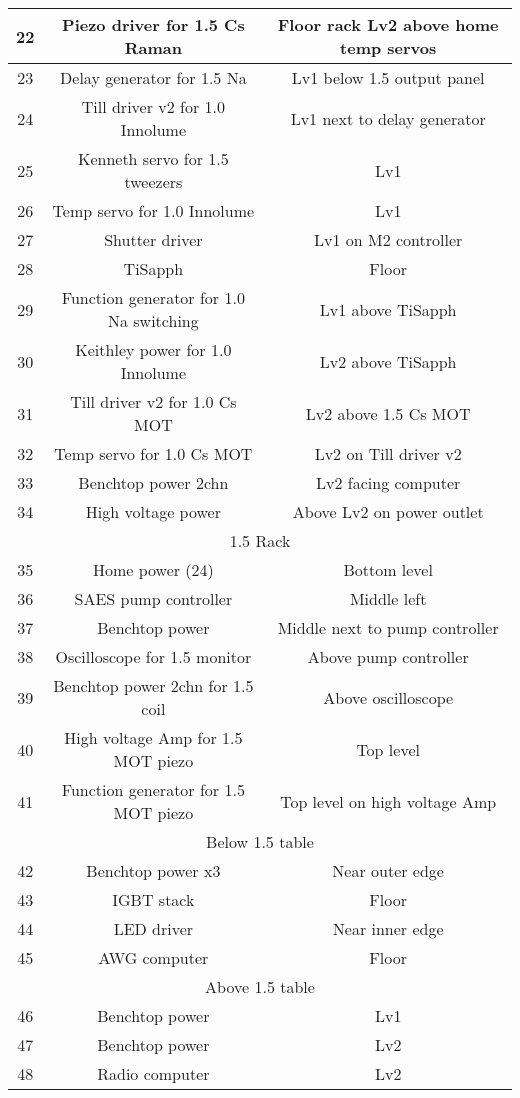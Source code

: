 \documentclass[10pt,fleqn,twocolumn]{article}
\begin{document}
\begin{longtable}{|c|c|c|}
  22&Piezo driver for 1.5 Cs Raman&Floor rack Lv2 above home temp servos\\\hline
  23&Delay generator for 1.5 Na&Lv1 below 1.5 output panel\\\hline
  24&Till driver v2 for 1.0 Innolume&Lv1 next to delay generator\\\hline
  25&Kenneth servo for 1.5 tweezers&Lv1\\\hline
  26&Temp servo for 1.0 Innolume&Lv1\\\hline
  27&Shutter driver&Lv1 on M2 controller\\\hline
  28&TiSapph&Floor\\\hline
  29&Function generator for 1.0 Na switching&Lv1 above TiSapph\\\hline
  30&Keithley power for 1.0 Innolume&Lv2 above TiSapph\\\hline
  31&Till driver v2 for 1.0 Cs MOT&Lv2 above 1.5 Cs MOT\\\hline
  32&Temp servo for 1.0 Cs MOT&Lv2 on Till driver v2\\\hline
  33&Benchtop power 2chn&Lv2 facing computer\\\hline
  34&High voltage power&Above Lv2 on power outlet\\\hline
  \multicolumn{3}{|c|}{1.5 Rack}\\\hline
  35&Home power (24)&Bottom level\\\hline
  36&SAES pump controller&Middle left\\\hline
  37&Benchtop power&Middle next to pump controller\\\hline
  38&Oscilloscope for 1.5 monitor&Above pump controller\\\hline
  39&Benchtop power 2chn for 1.5 coil&Above oscilloscope\\\hline
  40&High voltage Amp for 1.5 MOT piezo&Top level\\\hline
  41&Function generator for 1.5 MOT piezo&Top level on high voltage Amp\\\hline
  \multicolumn{3}{|c|}{Below 1.5 table}\\\hline
  42&Benchtop power x3&Near outer edge\\\hline
  43&IGBT stack&Floor\\\hline
  44&LED driver&Near inner edge\\\hline
  45&AWG computer&Floor\\\hline
  \multicolumn{3}{|c|}{Above 1.5 table}\\\hline
  46&Benchtop power&Lv1\\\hline
  47&Benchtop power&Lv2\\\hline
  48&Radio computer&Lv2\\\hline
\end{longtable}
\twocolumn
\end{document}
